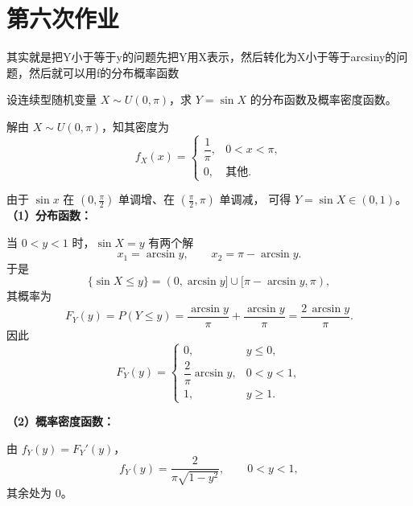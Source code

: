 \section{第六次作业}
\begin{dxtips}
    其实就是把Y小于等于y的问题先把Y用X表示，然后转化为X小于等于arcsiny的问题，然后就可以用f的分布概率函数
\end{dxtips}
\begin{homework}[42]
设连续型随机变量 $X \sim U(0,\pi)$，求 $Y=\sin X$ 的分布函数及概率密度函数。
\end{homework}
\begin{solution}
\textcolor{dxgreen}{解}\quad 由 $X\sim U(0,\pi)$，知其密度为
\[
f_X(x)=
\begin{cases}
\dfrac{1}{\pi}, & 0<x<\pi,\\[3pt]
0, & \text{其他}.
\end{cases}
\]

由于 $\sin x$ 在 $(0,\tfrac{\pi}{2})$ 单调增、在 $(\tfrac{\pi}{2},\pi)$ 单调减，
可得 $Y=\sin X\in(0,1)$。
\textbf{（1）分布函数：}

当 $0<y<1$ 时，$\sin X=y$ 有两个解
\[
x_1=\arcsin y,\qquad x_2=\pi-\arcsin y.
\]
于是
\[
\{\sin X\le y\}=(0,\arcsin y]\cup[\pi-\arcsin y,\pi),
\]
其概率为
\[
F_Y(y)=P(Y\le y)
=\frac{\arcsin y}{\pi}+\frac{\arcsin y}{\pi}
=\frac{2\,\arcsin y}{\pi}.
\]
因此
\[
F_Y(y)=
\begin{cases}
0, & y\le 0,\\[4pt]
\dfrac{2}{\pi}\arcsin y, & 0<y<1,\\[6pt]
1, & y\ge 1.
\end{cases}
\]

\textbf{（2）概率密度函数：}

由 $f_Y(y)=F_Y'(y)$，
\[
f_Y(y)
=\frac{2}{\pi\sqrt{1-y^2}},\qquad 0<y<1,
\]
其余处为 $0$。
\end{solution}









